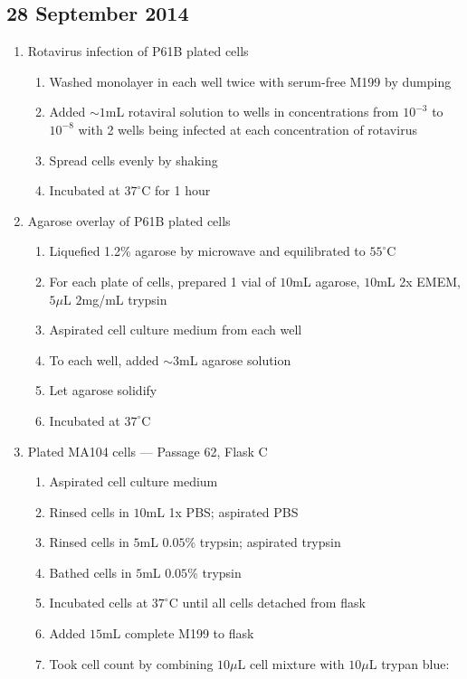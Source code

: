 
\subsection*{28 September 2014}

\begin{enumerate}
	\item Rotavirus infection of P61B plated cells
		\begin{enumerate}
			\item Washed monolayer in each well twice with serum-free M199 by dumping
			\item Added $\sim1$mL rotaviral solution to wells in concentrations from $10^{-3}$ to $10^{-8}$ with 2 wells being infected at each concentration of rotavirus
			\item Spread cells evenly by shaking
			\item Incubated at $37^{\circ}$C for 1 hour
		\end{enumerate}
	\item Agarose overlay of P61B plated cells
		\begin{enumerate}
			\item Liquefied 1.2\% agarose by microwave and equilibrated to $55^{\circ}$C
			\item For each plate of cells, prepared 1 vial of $10$mL agarose, $10$mL 2x EMEM, $5\mu$L $2$mg/mL trypsin
			\item Aspirated cell culture medium from each well
			\item To each well, added $\sim3$mL agarose solution
			\item Let agarose solidify
			\item Incubated at $37^{\circ}$C
		\end{enumerate}
	\item Plated MA104 cells --- Passage 62, Flask C
		\begin{enumerate}
			\item Aspirated cell culture medium
			\item Rinsed cells in $10$mL 1x PBS; aspirated PBS
			\item Rinsed cells in $5$mL $0.05$\% trypsin; aspirated trypsin
			\item Bathed cells in $5$mL $0.05$\% trypsin
			\item Incubated cells at $37^{\circ}$C until all cells detached from flask
			\item Added $15$mL complete M199 to flask
			\item Took cell count by combining $10\mu$L cell mixture with $10\mu$L trypan blue:
			

\end{enumerate}
\end{enumerate}
